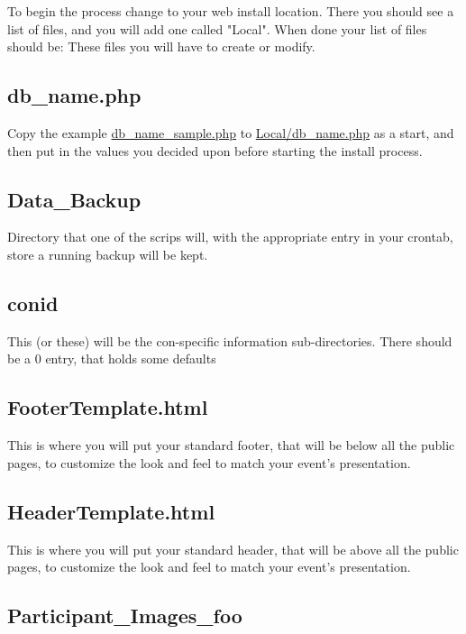 \documentclass[captions=tablesignature]{scrartcl}
\begin{document}
To begin the process change to your web install location.  There you
should see a list of files, and you will add one called "Local".
When done your list of files should be:
These files you will have to create or modify.
\subsection{db\_name.php}
\label{sec-3-1}

Copy the example \href{../webpages/db_name_sample.php}{db\_name\_sample.php} to \href{../Local/db_name.php}{Local/db\_name.php}
as a start, and then put in the values you decided upon before
starting the install process.

\subsection{Data\_Backup}
\label{sec-3-2}

Directory that one of the scrips will, with the appropriate entry
in your crontab, store a running backup will be kept.

\subsection{conid}
\label{sec-3-3}

This (or these) will be the con-specific information
sub-directories.
There should be a 0 entry, that holds some defaults

\subsection{FooterTemplate.html}
\label{sec-3-4}

This is where you will put your standard footer, that will be
below all the public pages, to customize the look and feel to
match your event's presentation.

\subsection{HeaderTemplate.html}
\label{sec-3-5}

This is where you will put your standard header, that will be
above all the public pages, to customize the look and feel to
match your event's presentation.

\subsection{Participant\_Images\_foo}
\label{sec-3-6}
\end{document}
